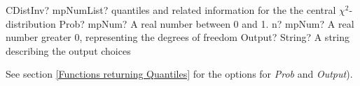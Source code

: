 \begin{mpFunctionsExtract}
	\mpFunctionThree
	{CDistInv? mpNumList? quantiles and related information for the the central $\chi^2$-distribution}
	{Prob? mpNum? A real number between 0 and 1.}
	{n? mpNum? A real number greater 0, representing the degrees of freedom}
	{Output? String? A string describing the output choices}
\end{mpFunctionsExtract}

See section \ref{Functions returning Quantiles} for the options for  {\itshape\sffamily Prob} and {\itshape\sffamily Output}). 

\vspace{0.3cm}

%
%
%







